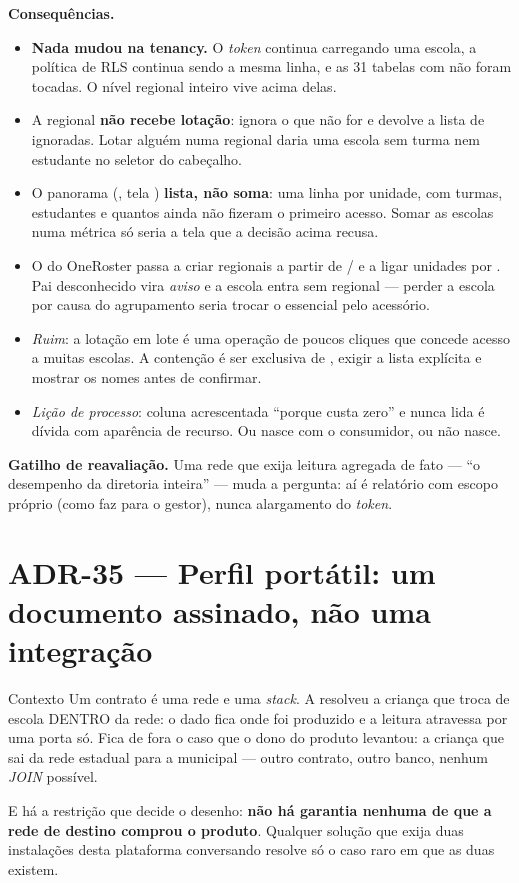 \textbf{Consequências.}
\begin{itemize}
  \item \textbf{Nada mudou na tenancy.} O \emph{token} continua carregando uma
    escola, a política de RLS continua sendo a mesma linha, e as 31 tabelas com
     não foram tocadas. O nível regional inteiro vive acima delas.
  \item A regional \textbf{não recebe lotação}:  ignora o que não
    for  e devolve a lista de ignoradas. Lotar alguém numa
    regional daria uma escola sem turma nem estudante no seletor do cabeçalho.
  \item O panorama (, tela
    ) \textbf{lista, não soma}: uma linha por unidade,
    com turmas, estudantes e quantos ainda não fizeram o primeiro acesso. Somar as
    escolas numa métrica só seria a tela que a decisão acima recusa.
  \item O  do OneRoster passa a criar regionais a partir de
    / e a ligar unidades por . Pai
    desconhecido vira \emph{aviso} e a escola entra sem regional --- perder a
    escola por causa do agrupamento seria trocar o essencial pelo acessório.
  \item \emph{Ruim}: a lotação em lote é uma operação de poucos cliques que
    concede acesso a muitas escolas. A contenção é ser exclusiva de
    , exigir a lista explícita e mostrar os nomes antes de
    confirmar.
  \item \emph{Lição de processo}: coluna acrescentada \enquote{porque custa zero}
    e nunca lida é dívida com aparência de recurso. Ou nasce com o consumidor,
    ou não nasce.
\end{itemize}

\textbf{Gatilho de reavaliação.} Uma rede que exija leitura agregada de fato
--- \enquote{o desempenho da diretoria inteira} --- muda a pergunta: aí é
relatório com escopo próprio (como  faz para o gestor),
nunca alargamento do \emph{token}.

\section{ADR-35 --- Perfil portátil: um documento assinado, não uma integração}
\label{adr:perfil-portatil}

\begin{especificacao}{Contexto}
Um contrato é uma rede e uma \emph{stack}. A  resolveu a criança
que troca de escola DENTRO da rede: o dado fica onde foi produzido e a leitura
atravessa por uma porta só. Fica de fora o caso que o dono do produto levantou:
a criança que sai da rede estadual para a municipal --- outro contrato, outro
banco, nenhum \emph{JOIN} possível.

E há a restrição que decide o desenho: \textbf{não há garantia nenhuma de que a
rede de destino comprou o produto}. Qualquer solução que exija duas instalações
desta plataforma conversando resolve só o caso raro em que as duas existem.
\end{especificacao}

